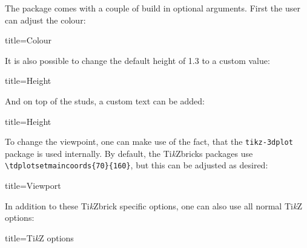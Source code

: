 \documentclass[parskip=half]{scrartcl}
\newcommand{\tikzbrick}{Ti\emph{k}Zbrick\xspace}
\begin{document}
The package comes with a couple of build in optional arguments. First the user can adjust the colour:
\begin{tcblisting}{title={Colour}}
\end{tcblisting}

It is also possible to change the default height of 1.3 to a custom value:
\begin{tcblisting}{title={Height}}
\end{tcblisting}

And on top of the studs, a custom text can be added:
\begin{tcblisting}{title={Height}}
\end{tcblisting}

To change the viewpoint, one can make use of the fact, that the \texttt{tikz-3dplot} package is used internally. By default, the \tikzbrick{}s packages use \lstinline|\tdplotsetmaincoords{70}{160}|, but this can be adjusted as desired:
\begin{tcblisting}{title={Viewport}}
\end{tcblisting}

In addition to these \tikzbrick specific options, one can also use all normal Ti\emph{k}Z options:
\begin{tcblisting}{title={Ti\emph{k}Z options}}
\end{tcblisting}
\end{document}

